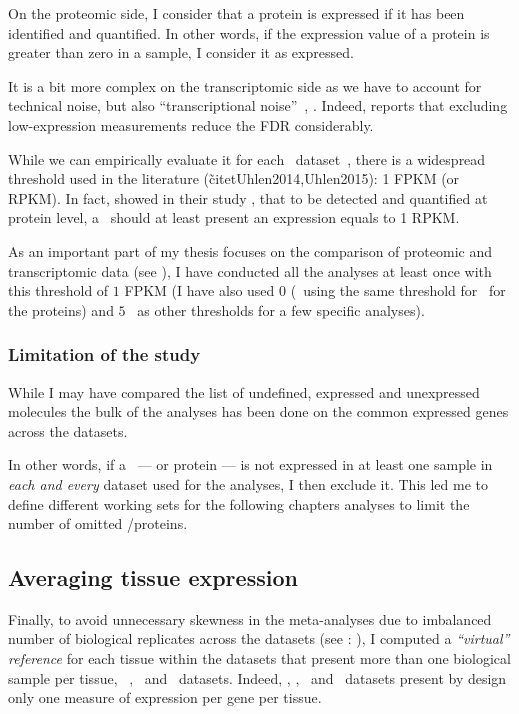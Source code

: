 On the proteomic side, I consider that a protein is expressed if it has been
identified and quantified. In other words, if the expression value of a protein
is greater than zero in a sample, I consider it as expressed.

\label{subsubsec:exprTrans}
It is a bit more complex on the transcriptomic side as
we have to account for technical noise,
but also \enquote{transcriptional noise}~,
.
Indeed, \citet{seqcmaqc} reports that
excluding low-expression measurements reduce the \gls{FDR} considerably.

While we can empirically evaluate it for each \Rnaseq\
dataset~,
there is a widespread threshold used in the literature
(\eg\~citet{Uhlen2014,Uhlen2015}):
1 \gls{FPKM} (or \gls{RPKM}).
In fact, \citet{Hebenstreit:2011} showed in their study
,
that to be detected and quantified at protein level,
a \mRNA\ should at least present an expression equals to 1 \gls{RPKM}.

As an important part of my thesis focuses on
the comparison of proteomic and transcriptomic data (see ),
I have conducted all the analyses at least once with this threshold of $1$ \gls{FPKM}
(I have also used $0$ (\ie\ using the same threshold for \mRNAs\
for the proteins) and $5$ \FPKM\ as other thresholds for a few specific analyses).

\subsubsection{Limitation of the study}
While I may have compared the list of
undefined, expressed and unexpressed molecules
the bulk of the analyses has been done on the common expressed genes across
the datasets.

In other words, if a \mRNA\ --- or protein --- is not expressed in at least
one sample in \emph{each and every} dataset used for the analyses,
I then exclude it.
This led me to define different working sets for the following chapters analyses
to limit the number of omitted \mRNAs/proteins.

\subsection{Averaging tissue expression}\label{subsec:averagedTissue}
Finally, to avoid unnecessary skewness in the meta-analyses due to
imbalanced number of
biological replicates across the datasets (see \Cref{sec:expDesign}:
),
I computed a \emph{\enquote{virtual} reference} for each tissue
within the datasets that present more than one biological sample per tissue,
\ie\ \vt, \uhlen\ and \gtex\ datasets.
Indeed, \castle, \cutler, \kuster\ and \pandey\ datasets present by design only
one measure of expression per gene per tissue.

